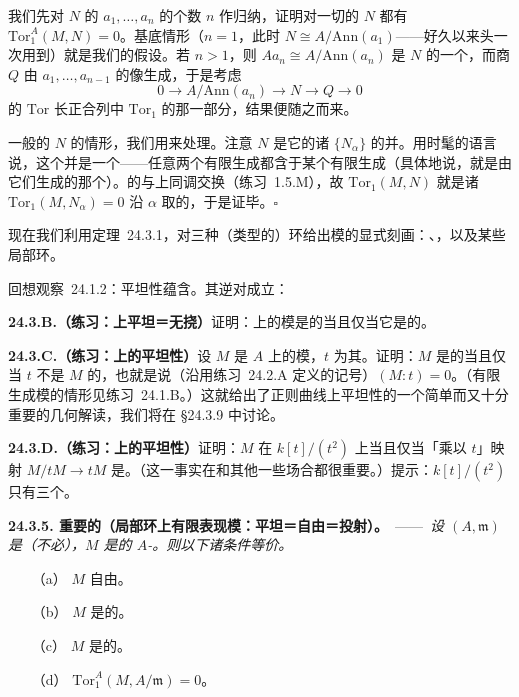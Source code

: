 我们先对 $N$ 的\trGenerator{} $a_1,\dots,a_n$ 的个数 $n$ 作归纳，证明对一切\trFinitelyGenerated{}的 $N$ 都有 $\mathrm{Tor}^A_1(M,N)=0$。基底情形（$n=1$，此时 $N\cong A/\mathrm{Ann}(a_1)$——好久以来头一次用到\trAnnihilatorIdeal）就是我们的假设。若 $n>1$，则 $Aa_n\cong A/\mathrm{Ann}(a_n)$ 是 $N$ 的一个\trSubmodule，而商 $Q$ 由 $a_1,\dots,a_{n-1}$ 的像生成，于是考虑
\[
0 \longrightarrow A/\mathrm{Ann}(a_n) \longrightarrow N \longrightarrow Q \longrightarrow 0
\]
的 $\mathrm{Tor}$ 长正合列中 $\mathrm{Tor}_1$ 的那一部分，结果便随之而来。

一般的 $N$ 的情形，我们用\trAbstractNonsense{}来处理。注意 $N$ 是它的诸\trFinitelyGenerated{}\trSubmodule{} $\{N_\alpha\}$ 的并。用时髦的语言说，这个并是一个\trFiltered\trColimit——任意两个有限生成\trSubmodule{}都含于某个有限生成\trSubmodule{}（具体地说，就是由它们生成的那个）。\trModule{}的\trFiltered\trColimit{}与上同调交换（\mbox{练习~1.5.M}），故 $\mathrm{Tor}_1(M,N)$ 就是诸 $\mathrm{Tor}_1(M,N_\alpha)=0$ 沿 $\alpha$ 取的\trColimit，于是证毕。\hfill$\square$

现在我们利用\mbox{定理~24.3.1}，对三种（类型的）环给出\trFlat{}模的显式刻画：\trPID、\trDualNumbers，以及某些局部环。

回想\mbox{观察~24.1.2}：平坦性蕴含\trTorsionFree。其逆对\trPID{}成立：

\textbf{24.3.B.（练习：\trPID{}上平坦＝无挠）}\quad 证明：\trPID{}上的模是\trFlat{}的当且仅当它是\trTorsionFree{}的。

\textbf{24.3.C.（练习：\trDVR{}上的平坦性）}\quad 设 $M$ 是\trDVR{} $A$ 上的模，$t$ 为其\trUniformizer。证明：$M$ 是\trFlat{}的当且仅当 $t$ 不是 $M$ 的\trZerodivisor，也就是说（沿用\mbox{练习~24.2.A} 定义的记号）$(M:t)=0$。（有限生成模的情形见\mbox{练习~24.1.B}。）这就给出了正则曲线上平坦性的一个简单而又十分重要的几何解读，我们将在 \S24.3.9 中讨论。

\textbf{24.3.D.（练习：\trDualNumbers{}上的平坦性）}\quad 证明：$M$ 在 $k[t]/(t^2)$ 上\trFlat{}当且仅当「乘以 $t$」映射 $M/tM\to tM$ 是\trIsomorphism。（这一事实在\trDeformationTheory{}和其他一些场合都很重要。）提示：$k[t]/(t^2)$ 只有三个\trIdeal。

\textbf{24.3.5. 重要的\trhTheorem（局部环上有限表现模：平坦＝自由＝投射）。}\ ——\ \emph{设 $(A,\mathfrak{m})$ 是\trLocalRing（不必\trNoether），$M$ 是\trFinitelyPresented{}的 $A$-\trModule。则以下诸条件等价。}
\begin{itemize}
\item[（a）]$M$ 自由。
\item[（b）]$M$ 是\trProjectiveObj{}的。
\item[（c）]$M$ 是\trFlat{}的。
\item[（d）]$\mathrm{Tor}^A_1(M,A/\mathfrak{m})=0$。
\end{itemize}

